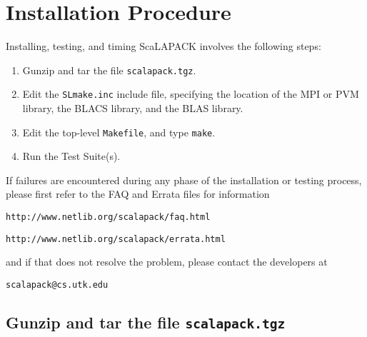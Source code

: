 \documentclass[11pt]{report}
\begin{document}
\section{Installation Procedure}\label{installation}

Installing, testing, and timing ScaLAPACK
involves the following steps: 
\begin{enumerate}
\item Gunzip and tar the file {\tt scalapack.tgz}.

\item Edit the {\tt SLmake.inc} include file, specifying the
      location of the MPI or PVM library, the BLACS library,
      and the BLAS library.

\item Edit the top-level {\tt Makefile}, and type {\tt make}.

\item Run the Test Suite(s).





\end{enumerate}

If failures are encountered during any phase of the installation or
testing process, please first refer to the FAQ and Errata files for
information
\begin{list}{}{}
\item {\tt http://www.netlib.org/scalapack/faq.html}
\item {\tt http://www.netlib.org/scalapack/errata.html}
\end{list}
and if that does not resolve the problem, please contact
the developers at
\begin{list}{}{}
\item {\tt scalapack@cs.utk.edu}
\end{list}

\subsection{Gunzip and tar the file {\tt scalapack.tgz}}
\end{document}

